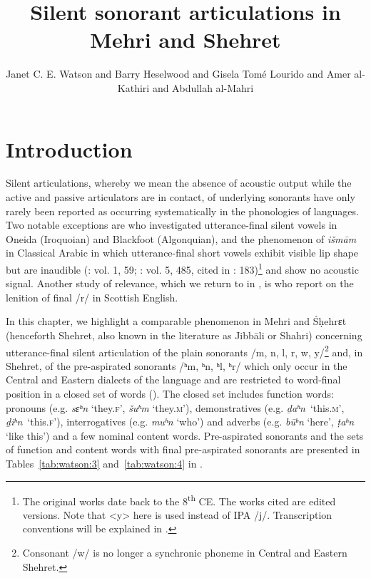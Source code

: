 \documentclass[output=paper]{langscibook}
\author{Janet C. E. Watson\affiliation{Sultan Qaboos University, Muscat and University of St. Andrews} and Barry Heselwood\affiliation{University of Leeds} and Gisela {Tomé Lourido}\affiliation{University of Leeds} and Amer al-Kathiri\affiliation{University of Technology and Applied Sciences, Salalah} and Abdullah al-Mahri\affiliation{Independent scholar, Salalah}}
\title{Silent sonorant articulations in Mehri and Shehret}
\begin{document}
\maketitle
{}

\section{Introduction} %
\label{sec:watson:1}
Silent articulations, whereby we mean the absence of acoustic output while the active and passive articulators are in contact, of underlying sonorants have only rarely been reported as occurring systematically in the phonologies of languages. Two notable exceptions are \citet{GickEtAl2012} who investigated utterance-final silent vowels in Oneida (Iroquoian) and Blackfoot (Algonquian), and the phenomenon of \textit{išmām} in Classical Arabic in which utterance-final short vowels exhibit visible lip shape but are inaudible (\citealt{Jinni1993}: vol. 1, 59; \citealt{Sibawayh2015}: vol. 5, 485, cited in \citealt{Al-Rumhi2021}: 183)\footnote{The original works date back to the 8\textsuperscript{th} CE. The works cited are edited versions. Note that <y> here is used instead of IPA \mbox{/j/}. Transcription conventions will be explained in .} and show no acoustic signal. Another study of relevance, which we return to in , is \citet{LawsonEtAl2015} who report on the lenition of final \mbox{/r/} in Scottish English.

In this chapter, we highlight a comparable phenomenon in Mehri and Śḥehrɛt (henceforth Shehret, also known in the literature as Jibbāli or Shahri) concerning utterance-final silent articulation of the plain sonorants /m, n, l, r, w, y/\footnote{Consonant \mbox{/w/} is no longer a synchronic phoneme in Central and Eastern Shehret.} and, in Shehret, of the pre-aspirated sonorants /ʰm, ʰn, ʰl, ʰr/ which only occur in the Central and Eastern dialects of the language and are restricted to word-final position in a closed set of words (\citet{WatsonHeselwood2016,WatsonEtAl2023}). The closed set includes function words: pronouns (e.g. \textit{sɛʰn} ‘they.\textsc{f}’, \textit{šuʰm} ‘they.\textsc{m}’), demonstratives (e.g. \textit{ḏaʰn}~‘this.\textsc{m}’, \textit{ḏiʰn}~‘this.\textsc{f}’), interrogatives (e.g. \textit{muʰn} ‘who’) and adverbs (e.g. \textit{būʰn} ‘here’, \textit{ṭaʰn} ‘like this’) and a few nominal content words. Pre-aspirated sonorants and the sets of function and content words with final pre-aspirated sonorants are presented in Tables~\ref{tab:watson:3} and~\ref{tab:watson:4} in .
\end{document}
